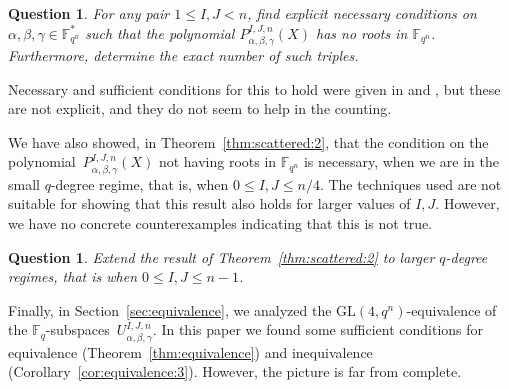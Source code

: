 \documentclass[11pt]{article}
\newtheorem{ques}[theo]{Question}
\theoremstyle{definition}
\numberwithin{equation}{section}
\begin{document}
\begin{ques} For any pair $1\leq I,J<n $, find explicit necessary conditions on~$\alpha,\beta,\gamma\in{\mathbb F}_{q^n}^*$ such that the polynomial $P_{\alpha, \beta, \gamma}^{I,J,n}(X)$ has no roots in ${\mathbb F}_{q^n}$. Furthermore, determine the exact number of such triples.
\end{ques}

Necessary and sufficient conditions for this to hold were given in \cite[Theorem 8]{mcguire2019characterization} and \cite[Theorem 9]{kim2021solving}, but these are not explicit, and they do not seem to help in the counting.

We have also showed, in Theorem~\ref{thm:scattered:2}, that the condition on the polynomial~$P_{\alpha, \beta, \gamma}^{I,J,n}(X)$ not having roots in ${\mathbb F}_{q^n}$ is necessary, when we are in the small $q$-degree regime, that is, when $0\leq I,J\leq n/4$. The techniques used are not suitable for showing that this result also holds for larger values of $I,J$. However, we have no concrete counterexamples indicating that this is not true.

\begin{ques} Extend the result of Theorem~\ref{thm:scattered:2} to larger $q$-degree regimes, that is when $0\leq I,J\leq n-1$. 
\end{ques}

Finally, in Section~\ref{sec:equivalence}, we analyzed the $\textrm{GL}(4,q^n)$-equivalence of the $\mathbb{F}_q$-subspaces~$U_{\alpha, \beta, \gamma}^{I,J,n}$. In this paper we found some sufficient conditions for equivalence (Theorem~\ref{thm:equivalence}) and inequivalence (Corollary~\ref{cor:equivalence:3}). However, the picture is far from complete.
\end{document}
